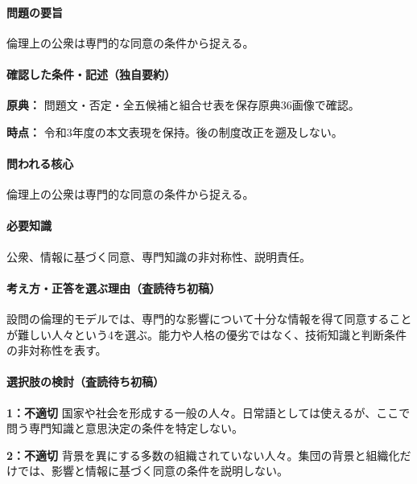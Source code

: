 \paragraph{問題の要旨} 倫理上の公衆は専門的な同意の条件から捉える。

\paragraph{確認した条件・記述（独自要約）}\mbox{}\par

\noindent\textbf{原典：} 問題文・否定・全五候補と組合せ表を保存原典36画像で確認。\par

\noindent\textbf{時点：} 令和3年度の本文表現を保持。後の制度改正を遡及しない。\par

\paragraph{問われる核心} 倫理上の公衆は専門的な同意の条件から捉える。

\paragraph{必要知識} 公衆、情報に基づく同意、専門知識の非対称性、説明責任。

\paragraph{考え方・正答を選ぶ理由（査読待ち初稿）} 設問の倫理的モデルでは、専門的な影響について十分な情報を得て同意することが難しい人々という4を選ぶ。能力や人格の優劣ではなく、技術知識と判断条件の非対称性を表す。

\paragraph{選択肢の検討（査読待ち初稿）}\mbox{}\par

\noindent\textbf{1：不適切} 国家や社会を形成する一般の人々。日常語としては使えるが、ここで問う専門知識と意思決定の条件を特定しない。\par

\noindent\textbf{2：不適切} 背景を異にする多数の組織されていない人々。集団の背景と組織化だけでは、影響と情報に基づく同意の条件を説明しない。\par

